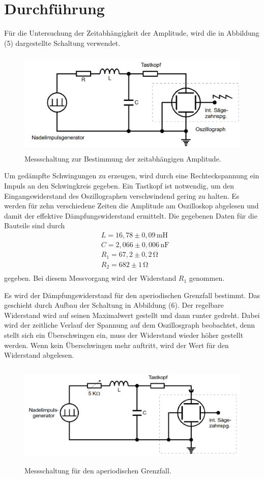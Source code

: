 \section{Durchführung}
\label{sec:Durchführung}

Für die Untersuchung der Zeitabhängigkeit der Amplitude, wird die in Abbildung (5) dargestellte Schaltung verwendet.

\begin{figure}[H]
  \centering
  \includegraphics[height=5cm]{Schaltung1.png}
  \caption{Messschaltung zur Bestimmung der zeitabhängigen Amplitude. \cite[S. 11]{kent}}
\end{figure}
\noindent Um gedämpfte Schwingungen zu erzeugen, wird durch eine Rechteckspannung ein Impuls an den Schwingkreis gegeben.
Ein Tastkopf ist notwendig, um den Eingangswiderstand des Oszillographen verschwindend gering zu halten. 
Es werden für zehn verschiedene Zeiten die Amplitude am Oszilloskop abgelesen und damit der effektive Dämpfungswiderstand ermittelt.
Die gegebenen Daten für die Bauteile sind durch 
\begin{align*}
&L = 16,78 \pm 0,09 \, \si{\milli\henry} \\
&C = 2,066 \pm 0,006 \, \si{\nano\farad} \\
&R_1 = 67,2 \pm 0,2 \, \si{\ohm} \\
&R_2 = 682 \pm 1 \, \si{\ohm} \\
\end{align*}
gegeben. Bei diesem Messvorgang wird der Widerstand $R_1$ genommen.


\noindent Es wird der Dämpfungswiderstand für den aperiodischen Grenzfall bestimmt. Das geschieht durch Aufbau der Schaltung in Abbildung (6).
Der regelbare Widerstand wird auf seinen Maximalwert gestellt und dann runter gedreht. Dabei wird der zeitliche Verlauf der Spannung auf dem Oszillosgraph 
beobachtet, denn stellt sich ein Überschwingen ein, muss der Widerstand wieder höher gestellt werden. Wenn kein Überschwingen mehr
auftritt, wird der Wert für den Widerstand abgelesen.
\begin{figure}[H]
  \centering
  \includegraphics[height=5cm]{Schaltung2.png}
  \caption{Messschaltung für den aperiodischen Grenzfall. \cite[S. 12]{kent}}
\end{figure}

